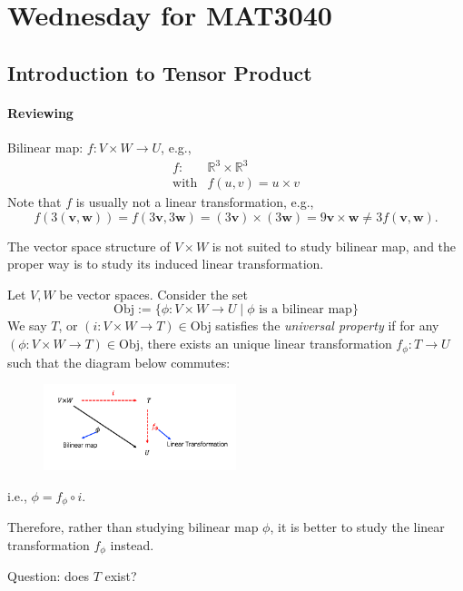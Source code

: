 
\section{Wednesday for MAT3040}
\subsection{Introduction to Tensor Product}
\paragraph{Reviewing}
Bilinear map: $f:V\times W\to U$, e.g.,
\[
\begin{array}{ll}
f:&\mathbb{R}^3\times\mathbb{R}^3\\
\text{with}&f(u,v)=u\times v
\end{array}
\]
Note that $f$ is usually not a linear transformation, e.g.,
\[
f(3(\bm v,\bm w)) = f(3\bm v,3\bm w) = (3\bm v)\times(3\bm w)=9\bm v\times\bm w\ne 3f(\bm v,\bm w).
\]

The vector space structure of $V\times W$ is not suited to study bilinear map, and the proper way is to study its induced linear transformation.

\begin{definition}
Let $V,W$ be vector spaces.
Consider the set
\[
\text{Obj}:=\{\phi:V\times W\to U\mid \text{$\phi$ is a bilinear map}\}
\]
We say $T$, or $(i:V\times W\to T)\in\text{Obj}$ satisfies the \emph{universal property} 
if for any $(\phi:V\times W\to T)\in\text{Obj}$, 
there exists an unique linear transformation $f_{\phi}:T\to U$ such that
the diagram below commutes:
\begin{figure}[H]
\centering
\includegraphics[width=0.5\textwidth]{week12/f_12_1}
\end{figure}
i.e., $\phi = f_{\phi}\circ i$.
\end{definition}
Therefore, rather than studying bilinear map $\phi$, it is better to study the linear transformation $f_\phi$ instead.

Question: does $T$ exist?

